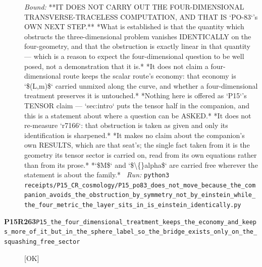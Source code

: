 \begin{description}
 \emph{Bound:}  **IT DOES NOT CARRY OUT THE FOUR-DIMENSIONAL TRANSVERSE-TRACELESS COMPUTATION, AND THAT IS `PO-83`'s OWN NEXT STEP.** *What is established is that the quantity which obstructs the three-dimensional problem vanishes IDENTICALLY on the four-geometry, and that the obstruction is exactly linear in that quantity --- which is a reason to expect the four-dimensional question to be well posed, not a demonstration that it is.*  *It does not claim a four-dimensional route keeps the scalar route's economy: that economy is `\$(L,m)\$` carried unmixed along the curve, and whether a four-dimensional treatment preserves it is untouched.*  *Nothing here is offered as `P15`'s TENSOR claim --- `sec:intro` puts the tensor half in the companion, and this is a statement about where a question can be ASKED.*  *It does not re-measure `r7166`: that obstruction is taken as given and only its identification is sharpened.*  *It makes no claim about the companion's own RESULTS, which are that seat's; the single fact taken from it is the geometry its tensor sector is carried on, read from its own equations rather than from its prose.*  *`\$M\$` and `\$\textbackslash\{\}alpha\$` are carried free wherever the statement is about the family.*
\ \emph{Run:} \texttt{python3 receipts/P15\_CR\_cosmology/P15\_po83\_does\_not\_move\_because\_the\_companion\_avoids\_the\_obstruction\_by\_symmetry\_not\_by\_einstein\_while\_the\_four\_metric\_the\_layer\_sits\_in\_is\_einstein\_identically.py}
\item[\rcptlabel{P15_the_four_dimensional_treatment_keeps_the_economy_and_keeps_more_of_it_but_in_the_sphere_label_so_the_bridge_exists_only_on_the_squashing_free_sector}{P15R263}\textbf{P15R263}\quad\texttt{P15\_the\_four\_dimensional\_treatment\_keeps\_the\_economy\_and\_keeps\_more\_of\_it\_but\_in\_the\_sphere\_label\_so\_the\_bridge\_exists\_only\_on\_the\_squashing\_free\_sector}]\hfill\textsf{[OK]}\\

\end{description}
